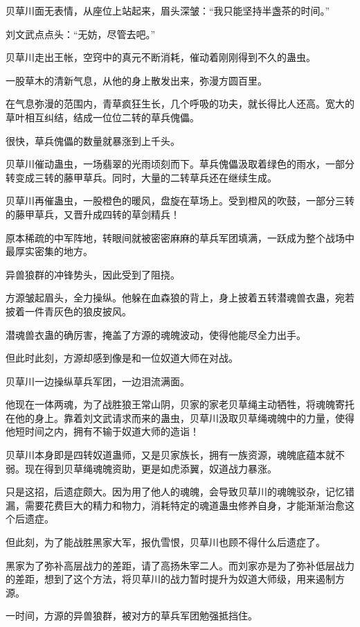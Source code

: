 \begin{this_body}
贝草川面无表情，从座位上站起来，眉头深皱：“我只能坚持半盏茶的时间。”

刘文武点点头：“无妨，尽管去吧。”

贝草川走出王帐，空窍中的真元不断消耗，催动着刚刚得到不久的蛊虫。

一股草木的清新气息，从他的身上散发出来，弥漫方圆百里。

在气息弥漫的范围内，青草疯狂生长，几个呼吸的功夫，就长得比人还高。宽大的草叶相互纠结，结成一位位二转的草兵傀儡。

很快，草兵傀儡的数量就暴涨到上千头。

贝草川催动蛊虫，一场翡翠的光雨顷刻而下。草兵傀儡汲取着绿色的雨水，一部分转变成三转的藤甲草兵。同时，大量的二转草兵还在继续生成。

贝草川再催蛊虫，一股橙色的暖风，盘旋在草场上。受到橙风的吹鼓，一部分三转的藤甲草兵，又晋升成四转的草剑精兵！

原本稀疏的中军阵地，转眼间就被密密麻麻的草兵军团填满，一跃成为整个战场中最厚实密集的地方。

异兽狼群的冲锋势头，因此受到了阻挠。

方源皱起眉头，全力操纵。他躲在血森狼的背上，身上披着五转潜魂兽衣蛊，宛若披着一件青灰色的狼皮披风。

潜魂兽衣蛊的确厉害，掩盖了方源的魂魄波动，使得他能尽全力出手。

但此时此刻，方源却感到像是和一位奴道大师在对战。

贝草川一边操纵草兵军团，一边泪流满面。

他现在一体两魂，为了战胜狼王常山阴，贝家的家老贝草绳主动牺牲，将魂魄寄托在他的身上。靠着刘文武请求而来的蛊虫，贝草川汲取贝草绳魂魄中的力量，使得他短时间之内，拥有不输于奴道大师的造诣！

贝草川本身即是四转奴道蛊师，又是贝家族长，拥有一族资源，魂魄底蕴本就不弱。现在得到贝草绳魂魄资助，更是如虎添翼，奴道战力暴涨。

只是这招，后遗症颇大。因为用了他人的魂魄，会导致贝草川的魂魄驳杂，记忆错漏，需要花费巨大的精力和物力，消耗特定的魂道蛊虫修养自身，才能渐渐治愈这个后遗症。

但此刻，为了能战胜黑家大军，报仇雪恨，贝草川也顾不得什么后遗症了。

黑家为了弥补高层战力的差距，请了高扬朱宰二人。而刘家亦是为了弥补低层战力的差距，想到了这个方法，将贝草川的战力暂时提升为奴道大师级，用来遏制方源。

一时间，方源的异兽狼群，被对方的草兵军团勉强抵挡住。


\end{this_body}
